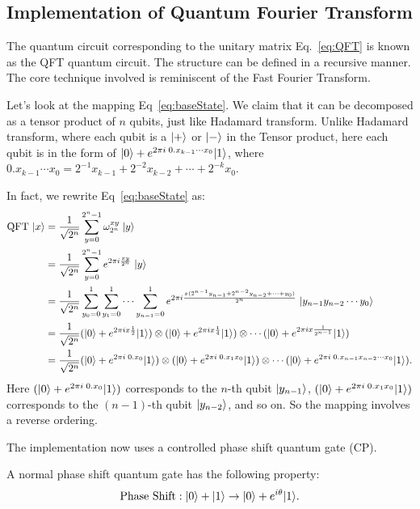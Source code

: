 \subsection{Implementation of Quantum Fourier Transform}
The quantum circuit corresponding to the unitary matrix Eq.~\ref{eq:QFT} is known as the QFT quantum circuit. The structure can be defined in a recursive manner. The core technique involved is reminiscent of the Fast Fourier Transform. 

Let's look at the mapping Eq~\ref{eq:baseState}. We claim that it can be decomposed as a tensor product of \(n\) qubits, just like Hadamard transform. Unlike Hadamard transform, where each qubit is a \(\lvert+\rangle\) or \(\lvert-\rangle\) in the Tensor product, here each qubit is in the form of \(\lvert0\rangle + e^{2\pi i \; 0.x_{k-1}\cdots x_0} \lvert1\rangle\), where \(0.x_{k-1}\cdots x_0 = 2^{-1}x_{k-1} + 2^{-2}x_{k-2}+ \cdots + 2^{-k}x_0.\)

In fact, we rewrite Eq~\ref{eq:baseState} as: 
\begin{align*}
    \mbox{QFT } \lvert x\rangle &= \frac{1}{\sqrt{2^n}} \sum_{y=0}^{2^n-1} \omega_{2^n}^{xy} \; \lvert y\rangle \\
    &= \frac{1}{\sqrt{2^n}} \sum_{y=0}^{2^n-1} e^{2\pi i \frac{xy}{2^n}} \; \lvert y\rangle \\
    &= \frac{1}{\sqrt{2^n}} \sum_{y_0=0}^{1}\sum_{y_1=0}^{1}\cdots\sum_{y_{n-1}=0}^{1}  e^{2\pi i \frac{x(2^{n-1} y_{n-1} +2^{n-2} y_{n-2} + \cdots + y_0)}{2^n}} \; \lvert y_{n-1}y_{n-2}\cdots y_0\rangle \\
    &= \frac{1}{\sqrt{2^n}} 
    (\lvert0\rangle + e^{2\pi i x \frac{1}{2}}\lvert1\rangle)\otimes
    (\lvert0\rangle + e^{2\pi i x \frac{1}{4}}\lvert1\rangle) \otimes
    \cdots 
    (\lvert0\rangle + e^{2\pi i x \frac{1}{2^{n-1}}}\lvert1\rangle) \\
    &= \frac{1}{\sqrt{2^n}} 
    (\lvert0\rangle + e^{2\pi i \; 0.x_0}\lvert1\rangle)\otimes
    (\lvert0\rangle + e^{2\pi i \;0.x_1x_0}\lvert1\rangle) \otimes
    \cdots 
    (\lvert0\rangle + e^{2\pi i \;0.x_{n-1}x_{n-2}\cdots x_0}\lvert1\rangle). 
\end{align*}
Here \((\lvert0\rangle + e^{2\pi i \; 0.x_0}\lvert1\rangle)\) corresponds to the \(n\)-th qubit \(\lvert y_{n-1}\rangle\), \((\lvert0\rangle + e^{2\pi i \; 0.x_1x_0}\lvert1\rangle)\) corresponds to the \((n-1)\)-th qubit \(\lvert y_{n-2}\rangle\), and so on. So the mapping involves a reverse ordering. 

The implementation now uses a controlled phase shift quantum gate (CP). 


A normal phase shift quantum gate has the following property: 
\[\mbox{Phase Shift}: \lvert0\rangle + \lvert1\rangle \rightarrow \lvert0\rangle+ e^{i \theta} \lvert1\rangle.\]


